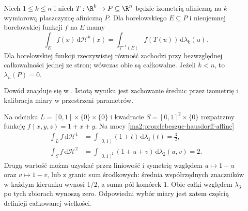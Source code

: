 \begin{stwierdzenie}
\label{ma2:prop:lebesgue-hausdorff-affine}
Niech $1\le k\le n$ i niech
$T:\R^k\to P\subseteq\R^n$ będzie
izometrią afiniczną na $k$-wymiarową
płaszczyznę afiniczną $P$.
Dla borelowskiego $E\subseteq P$
i nieujemnej borelowskiej funkcji $f$ na $E$
mamy
\[
 \int_E f(x)\,\mathrm d\mathcal H^k(x)
 =\int_{T^{-1}(E)}f(T(u))\,\mathrm d\lambda_k(u).
\]
Dla borelowskiej funkcji rzeczywistej
równość zachodzi przy bezwzględnej
całkowalności jednej ze stron;
wówczas obie są całkowalne.
Jeżeli $k<n$, to $\lambda_n(P)=0$.
\end{stwierdzenie}
Dowód znajduje się w
.
Istotą wyniku jest zachowanie średnic
przez izometrię i kalibracja miary
w przestrzeni parametrów.

\begin{przyklad}
\label{ma2:ex:lebesgue-hausdorff-dimensions}
Na odcinku $L=[0,1]\times\{0\}\times\{0\}$
i kwadracie $S=[0,1]^2\times\{0\}$
rozpatrzmy funkcję $f(x,y,z)=1+x+y$.
Na mocy \ref{ma2:prop:lebesgue-hausdorff-affine}
\[
 \begin{aligned}
 \int_L f\,\mathrm d\mathcal H^1
 &=\int_{[0,1]}(1+t)\,\mathrm d\lambda_1(t)
 =\frac32,\\
 \int_S f\,\mathrm d\mathcal H^2
 &=\int_{[0,1]^2}(1+u+v)\,\mathrm d\lambda_2(u,v)
 =2.
 \end{aligned}
\]
Drugą wartość można uzyskać przez liniowość
i symetrię względem $u\mapsto1-u$ oraz
$v\mapsto1-v$, lub z granic sum środkowych:
średnia współrzędnych znaczników w każdym
kierunku wynosi $1/2$, a suma pól komórek $1$.
Obie całki względem $\lambda_3$
po tych zbiorach wynoszą zero.
Odpowiedni wybór miary jest zatem
częścią definicji całkowanej wielkości.
\end{przyklad}

